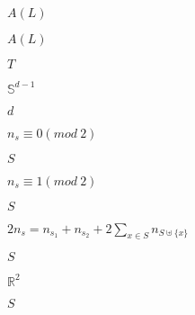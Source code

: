 \documentclass[10pt]{book}
\begin{document}
\begin{mdSnippets}
\begin{mdInlineSnippet}[0b34c4b04ade6c807c48f630e01b6425]%
$A(L)$\end{mdInlineSnippet}%
\begin{mdInlineSnippet}[0b34c4b04ade6c807c48f630e01b6425]%
$A(L)$\end{mdInlineSnippet}%
\begin{mdInlineSnippet}%
$T$\end{mdInlineSnippet}%
\begin{mdInlineSnippet}[dc4ff324bb17750b9a3373126ed59666]%
$\mathbb{S}^{d-1}$\end{mdInlineSnippet}%
\begin{mdInlineSnippet}[8277e0910d750195b448797616e091ad]%
$d$\end{mdInlineSnippet}%
\begin{mdInlineSnippet}%
$n_{s} \equiv 0(mod\ 2)$\end{mdInlineSnippet}%
\begin{mdInlineSnippet}%
$S$\end{mdInlineSnippet}%
\begin{mdInlineSnippet}%
$n_{s} \equiv 1 (mod\ 2)$\end{mdInlineSnippet}%
\begin{mdInlineSnippet}%
$S$\end{mdInlineSnippet}%
\begin{mdInlineSnippet}[10a2f426afd811e4b0073b72db76ea9e]%
$2n_{s} = n_{s_{1}} + n_{s_{2}} + 2\sum\limits_{x \in S}n_{S\uplus\{x\}}$\end{mdInlineSnippet}%
\begin{mdInlineSnippet}%
$S$\end{mdInlineSnippet}%
\begin{mdInlineSnippet}[d677d5de1c1560f9bf69456ab09c5064]%
$\mathbb{R}^{2}$\end{mdInlineSnippet}%
\begin{mdInlineSnippet}%
$S$\end{mdInlineSnippet}%

\end{mdSnippets}
\end{document}
